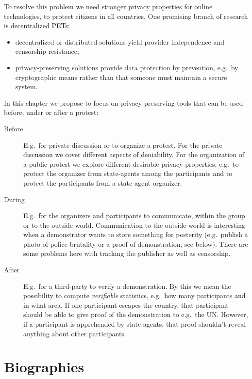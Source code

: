 \documentclass[a4paper]{llncs}
\begin{document}
To resolve this problem we need stronger privacy properties for online 
technologies, to protect citizens in all countries.
One promising branch of research is decentralized \acp{PET}:
\begin{itemize}
  \item decentralized or distributed solutions yield provider independence and 
    censorship resistance;
  \item privacy-preserving solutions provide data protection by prevention, 
    e.g.\ by cryptographic means rather than that someone must maintain 
    a secure system.
\end{itemize}
In this chapter we propose to focus on privacy-preserving tools that can be 
used before, under or after a protest:
\begin{description}

  \item[Before] E.g.\ for private discussion or to organize 
    a protest.
    For the private discussion we cover different aspects of deniability.
    For the organization of a public protest we explore different desirable 
    privacy properties, e.g.\ to protect the organizer from state-agents among 
    the participants and to protect the participants from a state-agent 
    organizer.

  \item[During] E.g.\ for the organizers and participants to communicate, 
    within the group or to the outside world.
    Communication to the outside world is interesting when a demonstrator wants 
    to store something for posterity (e.g.\ publish a photo of police brutality 
    or a proof-of-demonstration, see below).
    There are some problems here with tracking the publisher as well as 
    censorship.

  \item[After] E.g.\ for a third-party to verify a demonstration.
    By this we mean the possibility to compute \emph{verifiable} statistics, 
    e.g.\ how many participants and in what area.
    If one participant escapes the country, that participant should be able to 
    give proof of the demonstration to e.g.\ the UN\@.
    However, if a participant is apprehended by state-agents, that proof 
    shouldn't reveal anything about other participants.

\end{description}


\printbibliography{}


\appendix
\section{Biographies}
\label{Biography}
\end{document}

